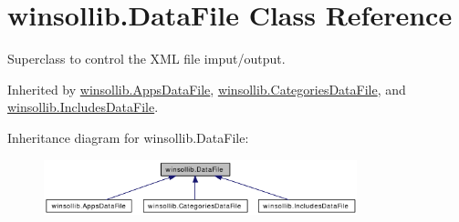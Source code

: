 \hypertarget{classwinsollib_1_1DataFile}{
\section{winsollib.Data\-File Class Reference}
\label{classwinsollib_1_1DataFile}
}
Superclass to control the XML file imput/output.  


Inherited by \hyperlink{classwinsollib_1_1AppsDataFile}{winsollib.Apps\-Data\-File}, \hyperlink{classwinsollib_1_1CategoriesDataFile}{winsollib.Categories\-Data\-File}, and \hyperlink{classwinsollib_1_1IncludesDataFile}{winsollib.Includes\-Data\-File}.

Inheritance diagram for winsollib.Data\-File:\begin{figure}[H]
\begin{center}
\leavevmode
\includegraphics[width=257pt]{classwinsollib_1_1DataFile__inherit__graph}
\end{center}
\end{figure}
